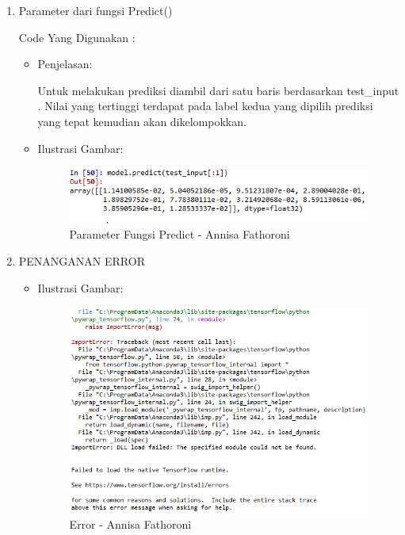 \begin{enumerate}
\begin{itemize}
\end{itemize}

\item Parameter dari fungsi Predict()

Code Yang Digunakan :


\begin{itemize}
\item Penjelasan:

Untuk melakukan prediksi diambil dari satu baris berdasarkan test\_input . Nilai yang tertinggi terdapat pada label kedua yang dipilih prediksi yang tepat kemudian akan dikelompokkan.

\item Ilustrasi Gambar:

\begin{figure}[!hbtp]
\centering
\includegraphics[scale=0.7]{figures/Chapter6AnnisaFathoroni24.png}
\caption{Parameter Fungsi Predict - Annisa Fathoroni}
\label{Parameter Fungsi Predict - Annisa Fathoroni}
\end{figure}

\end{itemize}

\item PENANGANAN ERROR

\begin{itemize}

\item Ilustrasi Gambar:

\begin{figure}[!hbtp]
\centering
\includegraphics[scale=0.7]{figures/Chapter6AnnisaFathoroniError.png}
\caption{Error - Annisa Fathoroni}
\label{Error - Annisa Fathoroni}
\end{figure}


\end{itemize}
\end{enumerate}
